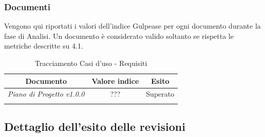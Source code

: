 \subsubsection{Documenti}
Vengono qui riportati i valori dell’indice Gulpease per ogni documento durante la fase
di Analisi. Un documento è considerato valido soltanto se rispetta le metriche descritte
su 4.1.
\begin{longtable}{|c|c|c|}
\hline
\textbf{Documento} & \textbf{Valore indice} & \textbf{Esito} \\
	\hline
	\emph{Piano di Progetto v1.0.0} & {???} & {Superato}\\
\hline
\caption[Tracciamento Casi d'uso - Requisiti]{Tracciamento Casi d'uso - Requisiti}
\label{tabella:requi-usecase}
\endhead
\end{longtable}
\subsection{Dettaglio dell’esito delle revisioni}

\pagebreak